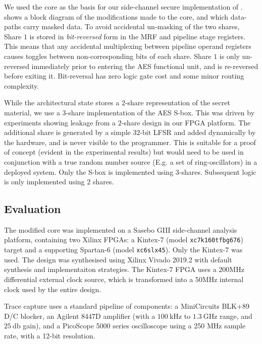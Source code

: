 We used the  core as the basis for our side-channel secure
implementation of .
 shows a block diagram of the modifications
made to the core, and which data-paths carry masked data.
To avoid accidental un-masking of the two shares,
Share $1$ is stored in {\em bit-reversed} form in the MRF and pipeline
stage registers.
This means that any accidental multiplexing between pipeline operand
registers causes toggles between non-corresponding bits of each share.
Share $1$ is only un-reversed immediately prior to entering the
AES functional unit, and is re-reversed before exiting it.
Bit-reversal has zero logic gate cost and some minor routing complexity.

While the architectural state stores a $2$-share representation
of the secret material, we use a $3$-share implementation of the
AES S-box.
This was driven by experiments showing 
leakage from a $2$-share design in our FPGA platform.
The additional share is generated by a simple $32$-bit LFSR and added
dynamically by the hardware, and is never visible to the programmer.
This is suitable for a proof of concept (evident in the experimental
results) but would need to be used in conjunction with a true random
number source (E.g. a set of ring-oscillators) in a deployed system.
Only the S-box is implemented using $3$-shares.
Subsequent  logic is only implemented using $2$ shares.

\subsection{Evaluation}

The modified  core was implemented on a
Sasebo GIII \cite{HKSS:12}
side-channel analysis platform, containing two Xilinx FPGAs:
a Kintex-7 
(model {\tt xc7k160tfbg676})
target
and
a supporting Spartan-6
(model {\tt xc6slx45}).
Only the Kintex-7 was used.
The design was synthesised using Xilinx Vivado 2019.2 with
default synthesis and implementaiton strategies.
The Kintex-7 FPGA uses a 200MHz differential external clock source, which is
transformed into a 50MHz internal clock used by the entire design.

Trace capture uses a standard pipeline of components:
a MiniCircuits BLK+89 D/C blocker,
an Agilent 8447D amplifier (with a $\SI{100}{\kilo\hertz}$ to $\SI{1.3}{\giga\hertz}$ range, and $\SI{25}{\decibel}$ gain),
and
a  PicoScope 5000 series oscilloscope using a
250 MHz sample rate, with a 12-bit resolution.

